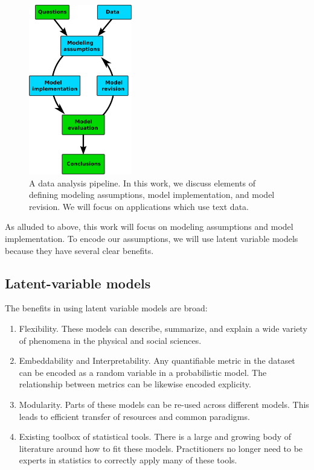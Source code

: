 \begin{figure}
  \center \includegraphics[width=0.4\textwidth]{chapter_introductory_material/figs/model_pipeline.pdf}
  \caption{A data analysis pipeline.  In this work, we discuss
    elements of defining modeling assumptions, model implementation,
    and model revision.  We will focus on applications which use
    text data.}
  \label{figure:data_analysis_pipeline}
\end{figure}

As alluded to above, this work will focus on modeling assumptions and
model implementation.  To encode our assumptions, we will use latent
variable models because they have several clear benefits.

\subsection{Latent-variable models}

The benefits in using latent variable models are broad:

  \begin{enumerate}
    \item Flexibility. These models can describe, summarize, and explain
    a wide variety of phenomena in the physical and social sciences.
    \item Embeddability and Interpretability.  Any quantifiable metric in the dataset
      can be encoded as a random variable in a probabilistic model.
      The relationship between metrics can be likewise encoded
      explicity. \label{lvm:matching}
    \item Modularity. Parts of these models can be re-used across
      different models.  This leads to efficient transfer of resources
      and common paradigms.
    \item Existing toolbox of statistical tools. There is a large and
      growing body of literature around how to fit these models.
      Practitioners no longer need to be experts in statistics to
      correctly apply many of these tools.
  \end{enumerate}

